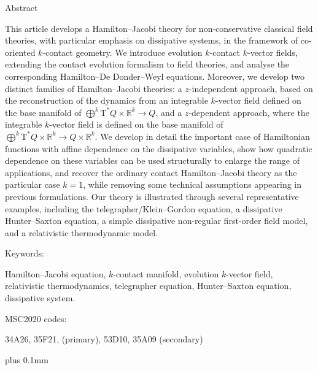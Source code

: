 \documentclass[11pt,twoside]{article}
\theoremstyle{plain}
\theoremstyle{definition}
\theoremstyle{remark}
\newcommand{\T}{\mathrm{T}}
\begin{document}
{\large\bfseries\raggedright Abstract}\vspace{1mm}\newline
{\raggedright
This article develops a Hamilton--Jacobi theory for non-conservative classical field theories, with particular emphasis on dissipative systems, in the framework of co-oriented \(k\)-contact geometry. We introduce evolution \(k\)-contact \(k\)-vector fields, extending the contact evolution formalism to field theories, and analyse the corresponding Hamilton--De Donder--Weyl equations. Moreover, we develop two distinct families of Hamilton--Jacobi theories: a \(z\)-independent approach, based on the reconstruction of the dynamics from an integrable \(k\)-vector field defined on the base manifold of \(\bigoplus^k\T^*Q\times\mathbb{R}^k\to Q\), and a \(z\)-dependent approach, where the integrable \(k\)-vector field is defined on the base manifold of \(\bigoplus^k\T^*Q\times\mathbb{R}^k\to Q\times\mathbb{R}^k\). We develop in detail the important case of Hamiltonian functions with affine dependence on the dissipative variables, show how quadratic dependence on these variables can be used structurally to enlarge the range of applications, and recover the ordinary contact Hamilton--Jacobi theory as the particular case \(k=1\), while removing some technical assumptions appearing in previous formulations. Our theory is illustrated through several representative examples, including the telegrapher/Klein--Gordon equation, a dissipative Hunter--Saxton equation, a simple dissipative non-regular first-order field model, and a relativistic thermodynamic model.
}

 
\bigskip

{\large\bfseries\raggedright Keywords:}
Hamilton--Jacobi equation, $k$-contact manifold, evolution $k$-vector field, relativistic thermodynamics, telegrapher equation, Hunter--Saxton equation, dissipative system.

\medskip

{\large\bfseries\raggedright MSC2020 codes:}
34A26, 35F21, (primary), 53D10, 35A09 (secondary)
\newpage



{\setcounter{tocdepth}{2}
\def\baselinestretch{1}
\small
\def\addvspace#1{\vskip 1pt}
\parskip 0pt plus 0.1mm
\tableofcontents
}
\end{document}

